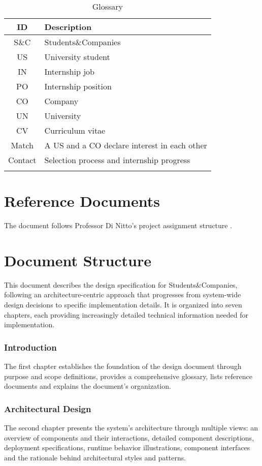 \renewcommand{\arraystretch}{1.5}
\begin{longtable}{|c|p{8.5cm}|}
    \hline \rowcolor{polimiblue!40}
    \textbf{ID} & \textbf{Description} \\ \hline
    S\&C & Students\&Companies \\ \hline
    US & University student \\ \hline
    IN & Internship job \\ \hline
    PO & Internship position \\ \hline
    CO & Company \\ \hline
    UN & University \\ \hline
    CV & Curriculum vitae \\ \hline
    Match & A US and a CO declare interest in each other \\ \hline
    Contact & Selection process and internship progress \\ \hline
\caption{Glossary}
\end{longtable}

\section{Reference Documents}
The document follows Professor Di Nitto's project assignment structure \cite{dinitto2024}.

\section{Document Structure}
This document describes the design specification for Students\&Companies, following an architecture-centric approach that progresses from system-wide design decisions to specific implementation details.
It is organized into seven chapters, each providing increasingly detailed technical information needed for implementation.

\subsubsection{Introduction}
The first chapter establishes the foundation of the design document through purpose and scope definitions, provides a comprehensive glossary, lists reference documents and explains the document's organization.

\subsubsection{Architectural Design}
The second chapter presents the system's architecture through multiple views: an overview of components and their interactions, detailed component descriptions, deployment specifications, runtime behavior illustrations, component interfaces and the rationale behind architectural styles and patterns.

